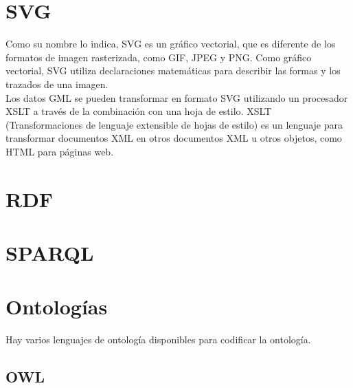 \section{SVG}

Como su nombre lo indica, SVG es un gráfico vectorial, que es diferente de los formatos de imagen rasterizada, como GIF, JPEG y PNG. Como gráfico vectorial, SVG utiliza declaraciones matemáticas para describir las formas y los trazados de una imagen.\\


Los datos GML se pueden transformar en formato SVG utilizando un procesador XSLT a través de la combinación con una hoja de estilo. XSLT (Transformaciones de lenguaje extensible de hojas de estilo) es un lenguaje para transformar documentos XML en otros documentos XML u otros objetos, como HTML para páginas web.


\section{RDF}

\section{SPARQL}

\section{Ontologías}








Hay varios lenguajes de ontología disponibles para codificar la ontología.

\subsection{OWL}






